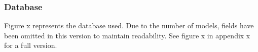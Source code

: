 \subsubsection{Database}
Figure x represents the database used. Due to the number of models, fields have been omitted in this version to maintain readability. See figure x in appendix x for a full version.